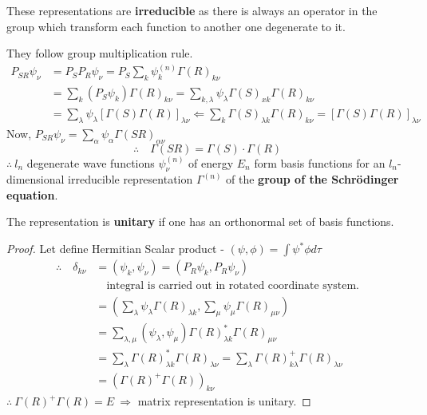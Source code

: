 These representations are {\bf irreducible} as there is always an operator in the group which transform each function to another one degenerate to it.

They follow group multiplication rule.
\begin{align*}
P_{SR}\psi_{\nu} &= P_{S}P_{R}\psi_{\nu}=P_{S}\sum\limits_{k}\psi^{(n)}_{k}\Gamma(R)_{k\nu}\\
&=\sum\limits_{k}(P_{S}\psi_{k})\Gamma(R)_{k\nu}=\sum\limits_{k,\lambda}\psi_{\lambda}\Gamma(S)_{xk}\Gamma(R)_{k\nu}\\
&= \sum\limits_{\lambda}\psi_{\lambda}[\Gamma(S)\Gamma(R)]_{\lambda\nu}\Leftarrow \sum\limits_{k}\Gamma(S)_{\lambda k}\Gamma(R)_{k\nu}=[\Gamma(S)\Gamma(R)]_{\lambda\nu}
\end{align*}
Now, $P_{SR}\psi_{\nu}=\sum\limits_{\alpha}\psi_{\alpha}\Gamma(SR)_{\alpha\nu}$
$$
\therefore\quad \Gamma(SR)=\Gamma(S)\cdot \Gamma(R)
$$
$\therefore \ l_{n}$ degenerate wave functions $\psi^{(n)}_{\nu}$ of energy $E_{n}$ form basis functions for an $l_{n}$-dimensional irreducible representation $\Gamma^{(n)}$ of the {\bf group of the Schr\"odinger equation}.

The representation is {\bf unitary} if one has an orthonormal set of basis functions.

\begin{proof}
Let define Hermitian Scalar product - $(\psi,\phi)=\int\psi^{*}\phi d\tau$
\begin{align*}
\therefore\quad \delta_{k\nu} &= (\psi_{k},\psi_{\nu})=(P_{R}\psi_{k},P_{R}\psi_{\nu})\\
&\quad\text{integral is carried out in rotated coordinate system.}\\
&= \left(\sum\limits_{\lambda}\psi_{\lambda}\Gamma(R)_{\lambda k},\sum\limits_{\mu}\psi_{\mu}\Gamma(R)_{\mu\nu}\right)\\
&= \sum\limits_{\lambda,\mu}(\psi_{\lambda},\psi_{\mu})\Gamma(R)^{*}_{\lambda k}\Gamma(R)_{\mu\nu}\\
&= \sum\limits_{\lambda}\Gamma(R)^{*}_{\lambda k}\Gamma(R)_{\lambda\nu}=\sum\limits_{\lambda}\Gamma(R)^{+}_{k\lambda}\Gamma(R)_{\lambda\nu}\\
&= (\Gamma(R)^{+}\Gamma(R))_{k\nu}
\end{align*}
$\therefore \ \Gamma(R)^{+}\Gamma(R)=E \ \Rightarrow$ matrix representation is unitary.
\end{proof}

